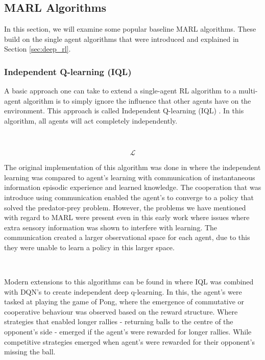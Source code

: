 \documentclass{article}
\begin{document}
\subsection{MARL Algorithms}\label{sec:marl_algorithms}

In this section, we will examine some popular baseline MARL algorithms. These build on the single agent algorithms that were introduced and explained in Section \ref{sec:deep_rl}. 

\subsubsection{Independent Q-learning (IQL)}

A basic approach one can take to extend a single-agent RL algorithm to a multi-agent algorithm is to simply ignore the influence that other agents have on the environment. This approach is called Independent Q-learning (IQL) \citep{tan1997MultiAgentRL}. In this algorithm, all agents will act completely independently.

\

\begin{equation}\label{eq:iql}
	\mathcal{L}
\end{equation}

The original implementation of this algorithm was done in \citet{tan1997MultiAgentRL} where the independent learning was compared to agent's learning with communication of instantaneous information episodic experience and learned knowledge. The cooperation that was introduce using communication enabled the agent's to converge to a policy that solved the predator-prey problem. However, the problems we have mentioned with regard to MARL were present even in this early work where issues where extra sensory information was shown to interfere with learning. The communication created a larger observational space for each agent, due to this they were unable to learn a policy in this larger space. \citep{tampuu2015multiagent}

\

Modern extensions to this algorithms can be found in \citet{tampuu2015multiagent} where IQL was combined with DQN's to create independent deep q-learning. In this, the agent's were tasked at playing the game of Pong, where the emergence of commutative or cooperative behaviour was observed based on the reward structure. Where strategies that enabled longer rallies - returning balls to the centre of the opponent's side - emerged if the agent's were rewarded for longer rallies. While competitive strategies emerged when agent's were rewarded for their opponent's missing the ball.
\end{document}
